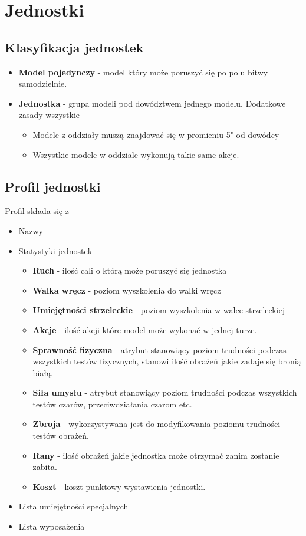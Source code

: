 \chapter{Jednostki}

\section{Klasyfikacja jednostek}
\begin{itemize}
    \item \textbf{Model pojedynczy} - model który może poruszyć się po polu bitwy samodzielnie.
    \item \textbf{Jednostka} - grupa modeli pod dowództwem jednego modelu.
    Dodatkowe zasady wszystkie
    \begin{itemize}
        \item Modele z oddziały muszą znajdować się w promieniu 5" od dowódcy
        \item Wszystkie modele w oddziale wykonują takie same akcje.
    \end{itemize}
\end{itemize}

\section{Profil jednostki}
Profil składa się z

\begin{itemize}
    \item Nazwy
    \item Statystyki jednostek
    \begin{itemize}
    	\item \textbf{Ruch} - ilość cali o którą może poruszyć się jednostka 
    	\item \textbf{Walka wręcz} - poziom wyszkolenia do walki wręcz
    	\item \textbf{Umiejętności strzeleckie} - poziom wyszkolenia w walce strzeleckiej
    	\item \textbf{Akcje} - ilość akcji które model może wykonać w jednej turze.
    	\item \textbf{Sprawność fizyczna} - atrybut stanowiący poziom trudności podczas wszystkich testów fizycznych, stanowi ilość obrażeń jakie zadaje się bronią białą. 
    	\item \textbf{Siła umysłu} - atrybut  stanowiący poziom trudności podczas wszystkich testów czarów, przeciwdziałania czarom etc.
    	\item \textbf{Zbroja} - wykorzystywana jest do modyfikowania poziomu trudności testów obrażeń. 
    	\item \textbf{Rany} - ilość obrażeń jakie jednostka może otrzymać zanim zostanie zabita. 
    	\item \textbf{Koszt} - koszt punktowy wystawienia jednostki. 
    \end{itemize} 
    \item Lista umiejętności specjalnych
    \item Lista wyposażenia 
\end{itemize}

